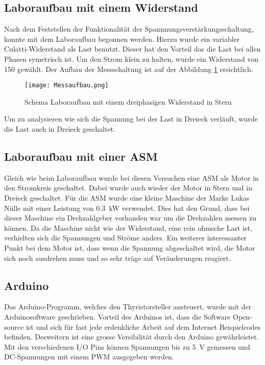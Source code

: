 \subsection{Laboraufbau mit einem Widerstand}
Nach dem Feststellen der Funktionalität der Spannnungsverstärkungsschaltung, konnte mit dem Laboraufbau begonnen werden. Hierzu wurde ein variabler Culatti-Widerstand als Last benutzt. Dieser hat den Vorteil das die Last bei allen Phasen symetrisch ist. Um den Strom klein zu halten, wurde ein Widerstand von \SI{150}{\Omega} gewählt. Der Aufbau der Messschaltung ist auf der Abbildung \ref{fig:Messaufbau} ersichtlich. 

\begin{figure}[ht!]
	\centering
	\texttt{[image: Messaufbau.png]}	
	\caption{Schema Laboraufbau mit einem dreiphasigen Widerstand in Stern}\label{fig:Messaufbau}
\end{figure}

Um zu analysieren wie sich die Spannung bei der Last in Dreieck verläuft, wurde die Last auch in Dreieck geschaltet.

\subsection{Laboraufbau mit einer ASM}
Gleich wie beim Laboraufbau wurde bei diesen Versuchen eine ASM als Motor in den Stromkreis geschaltet. Dabei wurde auch wieder der Motor in Stern und in Dreieck geschaltet. Für die ASM wurde eine kleine Maschine der Marke Lukas Nülle mit einer Leistung von \SI{0.3}{kW} verwendet. Dies hat den Grund, dass bei dieser Maschine ein Drehzahlgeber vorhanden war um die Drehzahlen messen zu können. Da die Maschine nicht wie der Widerstand, eine rein ohmsche Last ist, verhielten sich die Spannungen und Ströme anders. Ein weiterer interessanter Punkt bei dem Motor ist, dass wenn die Spannung abgeschaltet wird, die Motor sich noch ausdrehen muss und so sehr träge auf Veränderungen reagiert.

\subsection{Arduino}
Das Arduino-Programm, welches den Thyristorsteller ansteuert, wurde mit der Arduinosoftware geschrieben. Vorteil des Arduinos ist, dass die Software Open-source ist und sich für fast jede erdenkliche Arbeit auf dem Internet Beispielcodes befinden. Desweitern ist eine grosse Versibilität durch den Arduino gewährleistet. Mit den verschiedenen I/O Pins können Spannungen bis zu \SI{5}{V} gemessen und DC-Spannungen mit einem PWM ausgegeben werden.

